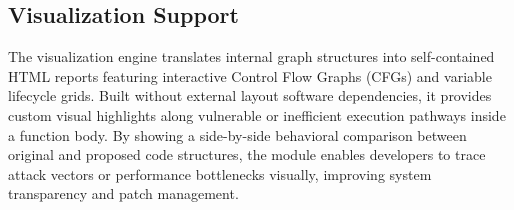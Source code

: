 \subsection{Visualization Support}
\hspace{0.5cm}
The visualization engine translates internal graph structures into self-contained HTML reports featuring interactive Control Flow Graphs (CFGs) and variable lifecycle grids. Built without external layout software dependencies, it provides custom visual highlights along vulnerable or inefficient execution pathways inside a function body. By showing a side-by-side behavioral comparison between original and proposed code structures, the module enables developers to trace attack vectors or performance bottlenecks visually, improving system transparency and patch management.